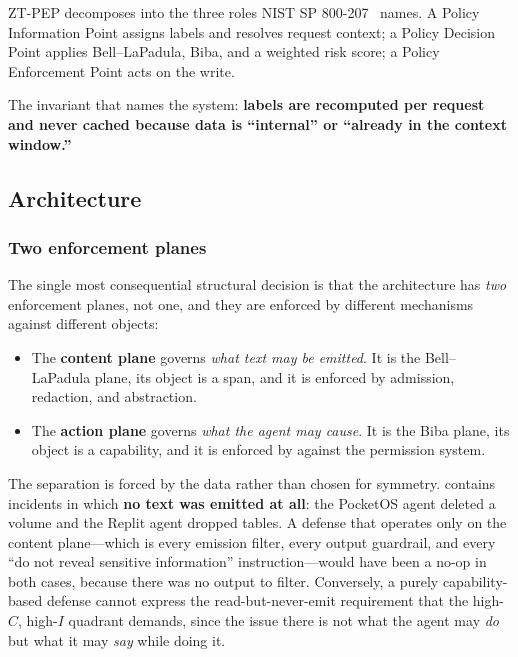 \documentclass[conference,compsoc]{IEEEtran}
\newcommand{\Cl}{\ensuremath{C}}                 %
\newcommand{\Il}{\ensuremath{I}}                 %
\newcommand{\sys}{ZT-PEP}                        %
\begin{document}
\sys{} decomposes into the three roles NIST SP 800-207~\cite{nist800207} names.
A Policy Information Point assigns labels and resolves request context; a
Policy Decision Point applies Bell--LaPadula, Biba, and a weighted risk score;
a Policy Enforcement Point acts on the write.

The invariant that names the system: \textbf{labels are recomputed per request
and never cached because data is ``internal'' or ``already in the context
window.''}

\subsection{Architecture}
\label{sec:method:arch}

\subsubsection{Two enforcement planes}
\label{sec:method:planes}

The single most consequential structural decision is that the architecture has
\emph{two} enforcement planes, not one, and they are enforced by different
mechanisms against different objects:

\begin{itemize}
  \item The \textbf{content plane} governs \emph{what text may be emitted}. It
  is the Bell--LaPadula plane, its object is a span, and it is enforced by
  admission, redaction, and abstraction.
  \item The \textbf{action plane} governs \emph{what the agent may cause}. It
  is the Biba plane, its object is a capability, and it is enforced by
   against the permission system.
\end{itemize}

The separation is forced by the data rather than chosen for symmetry.
 contains incidents in which \textbf{no text was emitted at
all}: the PocketOS agent deleted a volume and the Replit agent dropped tables.
A defense that operates only on the content plane---which is every emission
filter, every output guardrail, and every ``do not reveal sensitive
information'' instruction---would have been a no-op in both cases, because
there was no output to filter. Conversely, a purely capability-based defense
cannot express the read-but-never-emit requirement that the high-$\Cl$,
high-$\Il$ quadrant demands, since the issue there is not what the agent may
\emph{do} but what it may \emph{say} while doing it.
\end{document}
